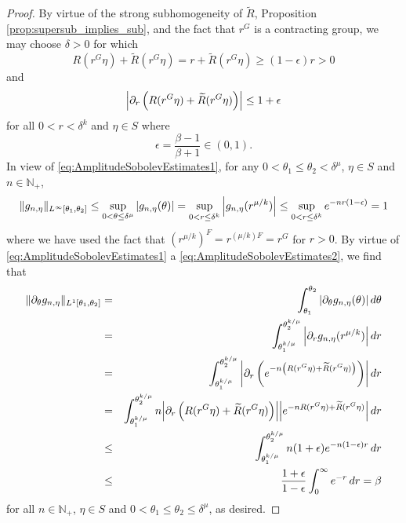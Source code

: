 \documentclass[11pt, letter]{book}
\newcommand{\p}{\partial}
\begin{document}
\begin{proof}
By virtue of the strong subhomogeneity of $\widetilde{R}$, Proposition \ref{prop:supersub_implies_sub}, and the fact that $r^G$ is a contracting group, we may choose $\delta>0$ for which 
\begin{equation}\label{eq:AmplitudeSobolevEstimates1}
    R(r^G\eta)+\widetilde{R}\left(r^G\eta\right)=r+\widetilde{R}\left(r^G\eta\right)\geq (1-\epsilon)r>0
\end{equation}
and
\begin{equation}\label{eq:AmplitudeSobolevEstimates2}
    \abs{\partial_r\left(R(r^G\eta)+\widetilde{R}(r^G\eta)\right)}\leq 1+\epsilon
\end{equation}
for all $0<r<\delta^k$ and $\eta\in S$ where
\begin{equation*}
    \epsilon=\frac{\beta-1}{\beta+1}\in(0,1).
\end{equation*}
In view of \eqref{eq:AmplitudeSobolevEstimates1}, for any $0<\theta_1\leq\theta_2<\delta^{\mu}$, $\eta\in S$ and $n\in\mathbb{N}_+$,
\begin{equation*}
\|g_{n,\eta}\|_{L^\infty[\theta_1,\theta_2]}\leq\sup_{0<\theta\leq\delta^{\mu}}\abs{g_{n,\eta}(\theta)}=\sup_{0<r\leq\delta^k}\abs{g_{n,\eta}(r^{\mu/k})}\leq \sup_{0<r\leq \delta^k}e^{-nr(1-\epsilon)}= 1
\end{equation*}
where we have used the fact that $(r^{\mu/k})^F=r^{(\mu/k)F}=r^G$ for $r>0$. By virtue of \eqref{eq:AmplitudeSobolevEstimates1} a \eqref{eq:AmplitudeSobolevEstimates2}, we find that
\begin{eqnarray*}
\|\partial_{\theta}g_{n,\eta}\|_{L^1[\theta_1,\theta_2]}
&=&\int_{\theta_1}^{\theta_2}\abs{\p_\theta g_{n,\eta}(\theta)}\,d\theta\\
&=&\int_{\theta_1^{k/\mu}}^{\theta_2^{k/\mu}}\abs{\p_r g_{n,\eta}(r^{\mu/k})}\,dr\\
&=&\int_{\theta_1^{k/\mu}}^{\theta_2^{k/\mu}}\abs{\p_r \left(e^{-n\left(R(r^G\eta)+\widetilde{R}(r^G\eta)\right)}\right) }\,dr\\
&=&\int_{\theta_1^{k/\mu}}^{\theta_2^{k/\mu}}n\abs{\partial_r\left(R(r^G\eta)+\widetilde{R}(r^G\eta)\right)}\abs{e^{-nR(r^G\eta)+\widetilde{R}(r^G\eta)}}\,dr\\
&\leq&\int_{\theta_1^{k/\mu}}^{\theta_2^{k/\mu}}n(1+\epsilon)e^{-n(1-\epsilon)r}\,dr\\
&\leq &\frac{1+\epsilon}{1-\epsilon}\int_0^\infty e^{-r}\,dr=\beta
\end{eqnarray*}
for all $n\in\mathbb{N}_+$, $\eta\in S$ and $0<\theta_1\leq\theta_2\leq\delta^{\mu}$, as desired.
\end{proof}
\end{document}
